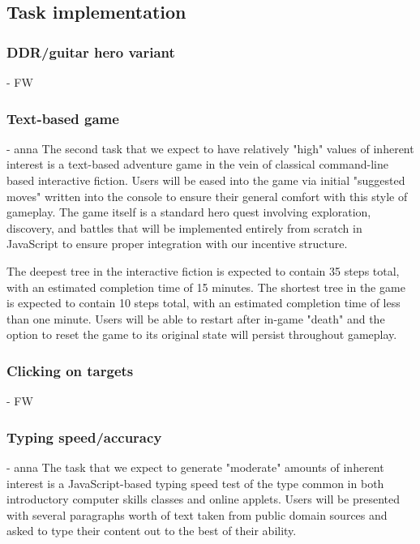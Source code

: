 \subsection{Task implementation}
\subsubsection{DDR/guitar hero variant} - FW
\subsubsection{Text-based game} - anna
The second task that we expect to have relatively "high" values of inherent interest is a text-based adventure game in the vein of classical command-line based interactive fiction. Users will be eased into the game via initial "suggested moves" written into the console to ensure their general comfort with this style of gameplay. The game itself is a standard hero quest involving exploration, discovery, and battles that will be implemented entirely from scratch in JavaScript to ensure proper integration with our incentive structure.

The deepest tree in the interactive fiction is expected to contain 35 steps total, with an estimated completion time of 15 minutes. The shortest tree in the game is expected to contain 10 steps total, with an estimated completion time of less than one minute. Users will be able to restart after in-game "death" and the option to reset the game to its original state will persist throughout gameplay. 
\subsubsection{Clicking on targets} - FW
\subsubsection{Typing speed/accuracy} - anna
The task that we expect to generate "moderate" amounts of inherent interest is a JavaScript-based typing speed test of the type common in both introductory computer skills classes and online applets. Users will be presented with several paragraphs worth of text taken from public domain sources and asked to type their content out to the best of their ability.
